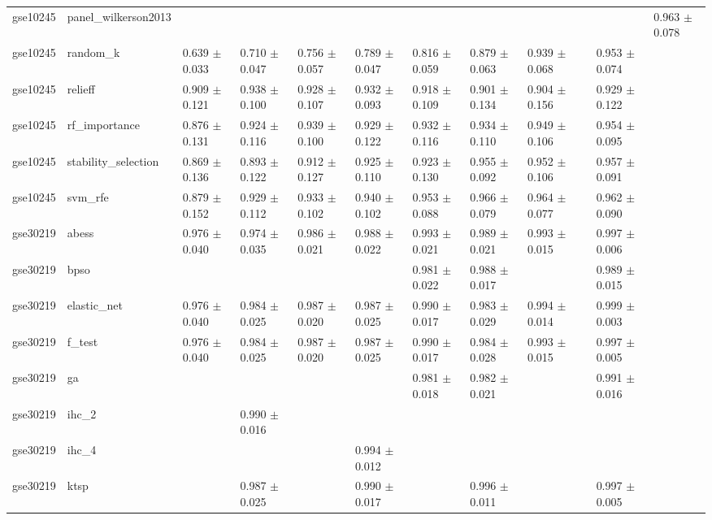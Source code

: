 \begin{table}[t]
\begin{tabular}{llllllllllll}
    gse10245 & panel\_wilkerson2013 &  &  &  &  &  &  &  &  &  & 0.963 $\pm$ 0.078 \\
    gse10245 & random\_k & 0.639 $\pm$ 0.033 & 0.710 $\pm$ 0.047 & 0.756 $\pm$ 0.057 & 0.789 $\pm$ 0.047 & 0.816 $\pm$ 0.059 & 0.879 $\pm$ 0.063 & 0.939 $\pm$ 0.068 &  & 0.953 $\pm$ 0.074 &  \\
    gse10245 & relieff & 0.909 $\pm$ 0.121 & 0.938 $\pm$ 0.100 & 0.928 $\pm$ 0.107 & 0.932 $\pm$ 0.093 & 0.918 $\pm$ 0.109 & 0.901 $\pm$ 0.134 & 0.904 $\pm$ 0.156 &  & 0.929 $\pm$ 0.122 &  \\
    gse10245 & rf\_importance & 0.876 $\pm$ 0.131 & 0.924 $\pm$ 0.116 & 0.939 $\pm$ 0.100 & 0.929 $\pm$ 0.122 & 0.932 $\pm$ 0.116 & 0.934 $\pm$ 0.110 & 0.949 $\pm$ 0.106 &  & 0.954 $\pm$ 0.095 &  \\
    gse10245 & stability\_selection & 0.869 $\pm$ 0.136 & 0.893 $\pm$ 0.122 & 0.912 $\pm$ 0.127 & 0.925 $\pm$ 0.110 & 0.923 $\pm$ 0.130 & 0.955 $\pm$ 0.092 & 0.952 $\pm$ 0.106 &  & 0.957 $\pm$ 0.091 &  \\
    gse10245 & svm\_rfe & 0.879 $\pm$ 0.152 & 0.929 $\pm$ 0.112 & 0.933 $\pm$ 0.102 & 0.940 $\pm$ 0.102 & 0.953 $\pm$ 0.088 & 0.966 $\pm$ 0.079 & 0.964 $\pm$ 0.077 &  & 0.962 $\pm$ 0.090 &  \\
    gse30219 & abess & 0.976 $\pm$ 0.040 & 0.974 $\pm$ 0.035 & 0.986 $\pm$ 0.021 & 0.988 $\pm$ 0.022 & 0.993 $\pm$ 0.021 & 0.989 $\pm$ 0.021 & 0.993 $\pm$ 0.015 &  & 0.997 $\pm$ 0.006 &  \\
    gse30219 & bpso &  &  &  &  & 0.981 $\pm$ 0.022 & 0.988 $\pm$ 0.017 &  &  & 0.989 $\pm$ 0.015 &  \\
    gse30219 & elastic\_net & 0.976 $\pm$ 0.040 & 0.984 $\pm$ 0.025 & 0.987 $\pm$ 0.020 & 0.987 $\pm$ 0.025 & 0.990 $\pm$ 0.017 & 0.983 $\pm$ 0.029 & 0.994 $\pm$ 0.014 &  & 0.999 $\pm$ 0.003 &  \\
    gse30219 & f\_test & 0.976 $\pm$ 0.040 & 0.984 $\pm$ 0.025 & 0.987 $\pm$ 0.020 & 0.987 $\pm$ 0.025 & 0.990 $\pm$ 0.017 & 0.984 $\pm$ 0.028 & 0.993 $\pm$ 0.015 &  & 0.997 $\pm$ 0.005 &  \\
    gse30219 & ga &  &  &  &  & 0.981 $\pm$ 0.018 & 0.982 $\pm$ 0.021 &  &  & 0.991 $\pm$ 0.016 &  \\
    gse30219 & ihc\_2 &  & 0.990 $\pm$ 0.016 &  &  &  &  &  &  &  &  \\
    gse30219 & ihc\_4 &  &  &  & 0.994 $\pm$ 0.012 &  &  &  &  &  &  \\
    gse30219 & ktsp &  & 0.987 $\pm$ 0.025 &  & 0.990 $\pm$ 0.017 &  & 0.996 $\pm$ 0.011 &  &  & 0.997 $\pm$ 0.005 &  \\

\end{tabular}
\end{table}
